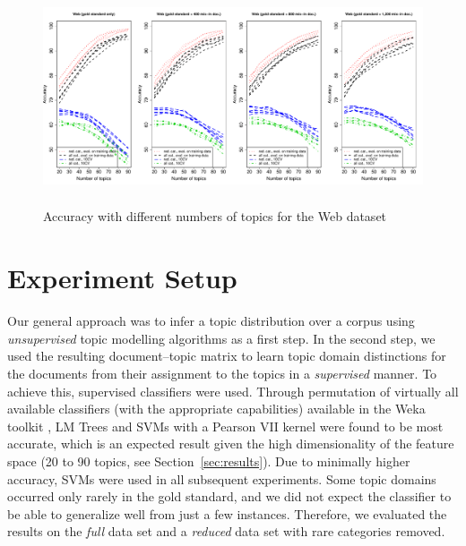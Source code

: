 \documentclass[11pt]{article}
\begin{document}
\begin{figure}[!ht]
  \centering
  \includegraphics[width=\textwidth, height=6.4cm]{graphics/cow.pdf}
  \caption{Accuracy with different numbers of topics for the Web dataset}
  \label{fig:cow}
\end{figure}

\section{Experiment Setup}
\label{sec:experiment}

Our general approach was to infer a topic distribution over a corpus using \textit{unsupervised} topic modelling algorithms as a first step.
In the second step, we used the resulting document--topic matrix to learn topic domain distinctions for the documents from their assignment to the topics in a \textit{supervised} manner.
To achieve this, supervised classifiers were used.
Through permutation of virtually all available classifiers (with the appropriate capabilities) available in the Weka toolkit \cite{HallWitten2011}, LM Trees \cite{LandwehrEa2005} and SVMs with a Pearson VII kernel \cite{UstunEa2006} were found to be most accurate, which is an expected result given the high dimensionality of the feature space (20 to 90 topics, see Section~\ref{sec:results}).
Due to minimally higher accuracy, SVMs were used in all subsequent experiments.
Some topic domains occurred only rarely in the gold standard, and we did not expect the classifier to be able to generalize well from just a few instances.
Therefore, we evaluated the results on the \textit{full} data set and a \textit{reduced} data set with rare categories removed.
\end{document}
